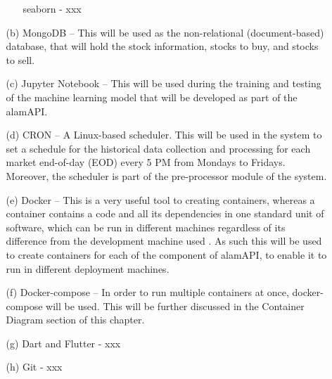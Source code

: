 \begin{itemize}
\begin{itemize}
\begin{itemize}
                    \item[\ding{109}] seaborn - xxx
                \end{itemize}
            \item[(b)] MongoDB – This will be used as the non-relational (document-based) database, 
            that will hold the stock information, stocks to buy, and stocks to sell.
            \item[(c)] Jupyter Notebook – This will be used during the training and testing of 
            the machine learning model that will be developed as part of the alamAPI.
            \item[(d)] CRON – A Linux-based scheduler. This will be used in the system to set a 
            schedule for the historical data collection and processing for each market end-of-day 
            (EOD) every 5 PM from Mondays to Fridays. Moreover, the scheduler is part of the 
            pre-processor module of the system.
            \item[(e)] Docker – This is a very useful tool to creating containers, 
            whereas a container contains a code and all its dependencies in one standard unit of software, 
            which can be run in different machines regardless of its difference from the development machine 
            used \cite{Docker}.
            As such this will be used to create containers for each of the component of alamAPI, 
            to enable it to run in different deployment machines.
            \item[(f)] Docker-compose – In order to run multiple containers at once, 
            docker-compose will be used. This will be further discussed in the Container Diagram 
            section of this chapter.
            \item[(g)] Dart and Flutter - xxx
            \item[(h)] Git - xxx
        \end{itemize}
\end{itemize}